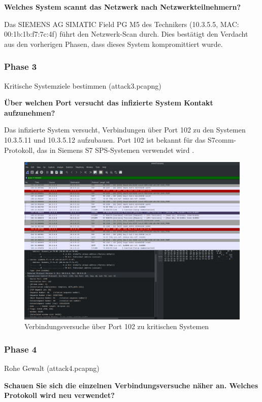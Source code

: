 \documentclass[
    a4paper,
    pagesize,
	pdftex,
    12pt,
]{scrartcl}
\begin{document}
\textbf{Welches System scannt das Netzwerk nach Netzwerkteilnehmern?}

Das SIEMENS AG SIMATIC Field PG M5 des Technikers (10.3.5.5, MAC: 00:1b:1b:f7:7c:4f) führt den Netzwerk-Scan durch. Dies bestätigt den Verdacht aus den vorherigen Phasen, dass dieses System kompromittiert wurde.

\subsubsection{Phase 3}
Kritische Systemziele bestimmen (attack3.pcapng)

\textbf{Über welchen Port versucht das infizierte System Kontakt aufzunehmen?}

Das infizierte System versucht, Verbindungen über Port 102 zu den Systemen 10.3.5.11 und 10.3.5.12 aufzubauen. Port 102 ist bekannt für das S7comm-Protokoll, das in Siemens S7 SPS-Systemen verwendet wird  \cite{port-sps}.

\begin{figure}[H]
    \centering
    \includegraphics[width=\textwidth]{ws-port-102-connections.png}
    \caption{Verbindungsversuche über Port 102 zu kritischen Systemen}
    \label{fig:ws-port-102-connections}
\end{figure}

\subsubsection{Phase 4}
Rohe Gewalt (attack4.pcapng)

\textbf{Schauen Sie sich die einzelnen Verbindungsversuche näher an. Welches Protokoll wird neu verwendet?}
\end{document}
